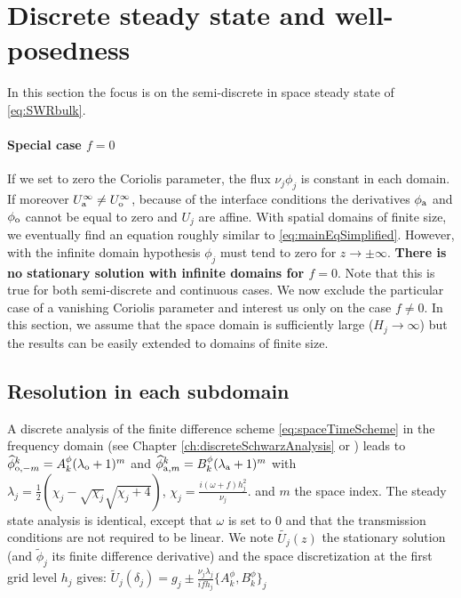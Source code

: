 \section{Discrete steady state and well-posedness}
\label{sec:OASchwarz_DiscreteStationaryState}
In this section the focus is on the semi-discrete in space
steady state of \eqref{eq:SWRbulk}.
\paragraph{Special case $f=0$}
If we set to zero the Coriolis parameter,
the flux $\nu_j\phi_j$ is constant in each domain.
If moreover $U_{\rm a}^{\infty} \neq U_{\rm o}^{\infty}$,
because of the interface conditions
the derivatives $\phi_{\rm a}$ and $\phi_{\rm o}$
cannot be equal to zero and $U_j$ are affine.
With spatial domains of finite size, we eventually
find an equation roughly similar to \eqref{eq:mainEqSimplified}.
However, with the infinite domain hypothesis
$\phi_j$ must tend to zero for $z\rightarrow \pm \infty$.
\textbf{There is no stationary solution with infinite domains
for $f=0$}. Note that this is true for both semi-discrete
and continuous cases.
\newline
We now exclude the particular case of a vanishing Coriolis parameter
and interest us only on the case $f\neq 0$.
In this section, we assume that the space domain is sufficiently
large ($H_j \rightarrow \infty$) but the results can be easily
extended to domains of finite size.
\subsection{Resolution in each subdomain}
A discrete analysis of the finite difference scheme \eqref{eq:spaceTimeScheme}
in the frequency domain (see Chapter \ref{ch:discreteSchwarzAnalysis} or
\cite{wu_optimized_2017}) leads to 
$\widehat{\phi}_{{\rm o}, -m}^k = A_k^{\phi} (\lambda_{\rm o}+1)^m$
and
$\widehat{\phi}_{{\rm a}, m}^k = B_k^{\phi} (\lambda_{\rm a}+1)^m$ 
with $\lambda_j = \frac{1}{2}\left(\chi_j - \sqrt{\chi_j} \sqrt{\chi_j + 4}\right)$, 
$\chi_j=\frac{i (\omega+f) h_j^2}{\nu_j}$.
and $m$ the space index.
The steady state analysis is identical, except that $\omega$ is set to 0 and that the transmission conditions are not required
to be linear. 
We note $\widetilde{U_j}(z)$ the stationary solution (and $\widetilde{\phi}_j$ its finite difference derivative) and the space discretization at the first grid level $h_j$ gives:
$\widetilde{U}_j(\delta_j) = g_j \pm \frac{\nu_j\lambda_j}{if h_j} \{A_k^{\phi}, B_k^{\phi}\}_j$

